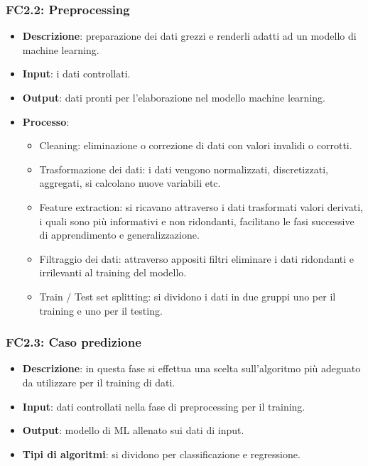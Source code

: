 \subsubsection{FC2.2: Preprocessing}

\begin{itemize}
	\item \textbf{Descrizione}: preparazione dei dati grezzi e renderli adatti ad un modello di machine learning. 
	\item \textbf{Input}: i dati controllati.
	\item \textbf{Output}: dati pronti per l'elaborazione nel modello machine learning.
	\item \textbf{Processo}: \begin{itemize}[leftmargin = 2cm]
		\item Cleaning: eliminazione o correzione di dati con valori invalidi o corrotti.
		\item Trasformazione dei dati: i dati vengono normalizzati, discretizzati, aggregati, si calcolano nuove variabili etc.
		\item Feature extraction: si ricavano attraverso i dati trasformati valori derivati, i quali sono più informativi e non ridondanti, facilitano le fasi successive di apprendimento e generalizzazione.
		\item Filtraggio dei dati: attraverso appositi filtri eliminare i dati ridondanti e irrilevanti al training del modello.
		\item Train / Test set splitting: si dividono i dati in due gruppi uno per il training e uno per il testing.
	\end{itemize}

\end{itemize}

\subsubsection{FC2.3: Caso predizione}

\begin{itemize}
	\item \textbf{Descrizione}: in questa fase si effettua una scelta sull'algoritmo più adeguato da utilizzare per il training di dati.
	\item \textbf{Input}: dati controllati nella fase di preprocessing per il training.
	\item \textbf{Output}: modello di ML allenato sui dati di input.
	\item \textbf{Tipi di algoritmi}: si dividono per classificazione e regressione.%
\end{itemize}

